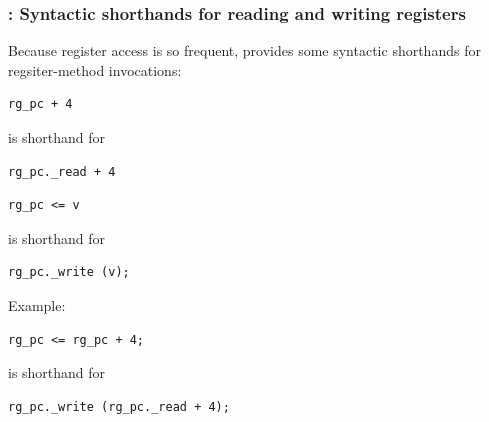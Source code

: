 \begin{frame}[fragile]
\frametitle{{\BSV}: Syntactic shorthands for reading and writing registers}

\footnotesize

Because register access is so frequent, {\BSV} provides some syntactic
shorthands for regsiter-method invocations:

\vspace{2ex}

\begin{center}
 \begin{minipage}{0.25\textwidth}
  \begin{Verbatim}[frame=single]
  rg_pc + 4
  \end{Verbatim}
 \end{minipage}
 \hm is shorthand for \hm
 \begin{minipage}{0.35\textwidth}
  \begin{Verbatim}[frame=single]
  rg_pc._read + 4
  \end{Verbatim}
 \end{minipage}

 \begin{minipage}{0.25\textwidth}
  \begin{Verbatim}[frame=single]
  rg_pc <= v
  \end{Verbatim}
 \end{minipage}
 \hm is shorthand for \hm
 \begin{minipage}{0.35\textwidth}
  \begin{Verbatim}[frame=single]
  rg_pc._write (v);
  \end{Verbatim}
 \end{minipage}
\end{center}

\PAUSE{\vspace{4ex}}

Example:

\vspace{1ex}

\begin{center}
 \begin{minipage}{0.25\textwidth}
  \begin{Verbatim}[frame=single]
  rg_pc <= rg_pc + 4;
  \end{Verbatim}
 \end{minipage}
 \hm is shorthand for \hm
 \begin{minipage}{0.35\textwidth}
  \begin{Verbatim}[frame=single]
  rg_pc._write (rg_pc._read + 4);
  \end{Verbatim}
 \end{minipage}
\end{center}

\end{frame}

